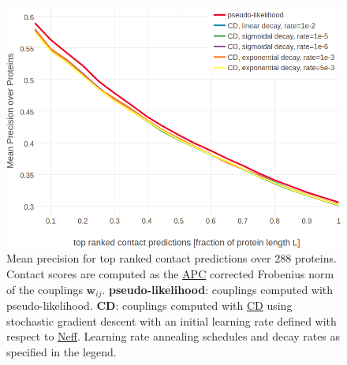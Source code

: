 \documentclass[11pt,a4paper,twoside]{book}
\newcommand{\wij}{\mathbf{w}_{ij}}
\theoremstyle{definition}
\theoremstyle{definition}
\theoremstyle{remark}
\begin{document}
\begin{figure}

{\centering \includegraphics[width=1\linewidth]{img/full_likelihood/sgd/precision_vs_rank_schedules} 

}

\caption{Mean precision for
top ranked contact predictions over 288 proteins. Contact scores are
computed as the \protect\hyperlink{abbrev}{APC} corrected Frobenius norm
of the couplings \(\wij\). \textbf{pseudo-likelihood}: couplings
computed with pseudo-likelihood. \textbf{CD}: couplings computed with
\protect\hyperlink{abbrev}{CD} using stochastic gradient descent with an
initial learning rate defined with respect to
\protect\hyperlink{abbrev}{Neff}. Learning rate annealing schedules and
decay rates as specified in the legend.}\label{fig:performance-cd-learnignrate-schedules}
\end{figure}
\end{document}
